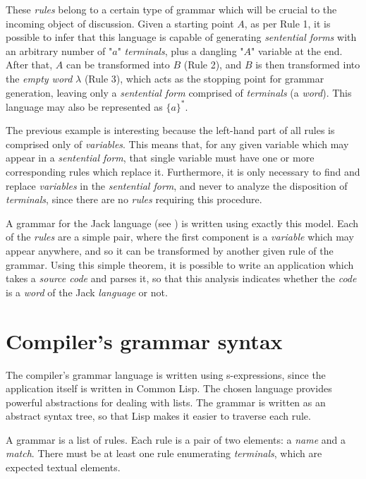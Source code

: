 \documentclass[a4paper,11pt,oneside]{article}
\begin{document}
These \emph{rules} belong to a certain type of grammar which will be crucial
to the incoming object of discussion. Given a starting point \(A\), as
per Rule 1, it is possible to infer that this language is capable of
generating \emph{sentential forms} with an arbitrary number of "\(a\)"
\emph{terminals}, plus a dangling "\(A\)" variable at the end. After that, \(A\)
can be transformed into \(B\) (Rule 2), and \(B\) is then transformed into
the \emph{empty word} \(\lambda\) (Rule 3), which acts as the stopping point
for grammar generation, leaving only a \emph{sentential form} comprised of
\emph{terminals} (a \emph{word}). This language may also be represented as
\(\{a\}^{*}\).

The previous example is interesting because the left-hand part of all
rules is comprised only of \emph{variables}. This means that, for any given
variable which may appear in a \emph{sentential form}, that single variable
must have one or more corresponding rules which replace
it. Furthermore, it is only necessary to find and replace \emph{variables} in
the \emph{sentential form}, and never to analyze the disposition of
\emph{terminals}, since there are no \emph{rules} requiring this procedure.

A grammar for the Jack language (see \cite{nand2tetris}) is written
using exactly this model. Each of the \emph{rules} are a simple pair, where
the first component is a \emph{variable} which may appear anywhere, and so it
can be transformed by another given rule of the grammar. Using this
simple theorem, it is possible to write an application which takes a
\emph{source code} and parses it, so that this analysis indicates whether the
\emph{code} is a \emph{word} of the Jack \emph{language} or not.

\section{Compiler's grammar syntax}
\label{sec:org08dad9c}

The compiler's grammar language is written using s-expressions, since
the application itself is written in Common Lisp. The chosen language
provides powerful abstractions for dealing with lists. The grammar is
written as an abstract syntax tree, so that Lisp makes it easier to
traverse each rule.

A grammar is a list of rules. Each rule is a pair of two elements: a
\emph{name} and a \emph{match}. There must be at least one rule enumerating
\emph{terminals}, which are expected textual elements.
\end{document}
